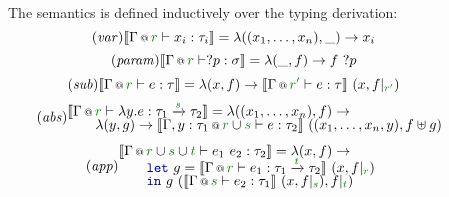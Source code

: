 \begin{figure}

{\small The semantics is defined inductively over the typing derivation:}
\begin{equation}
\tag{\emph{var}}
\sem{\coctx{\Gamma}{\cclrd{r}} \vdash x_i : \tau_i} = \lambda ((x_1, \ldots, x_n), \_) \rightarrow x_i
\end{equation}
\vspace{-1.5em}
\begin{equation}
\tag{\emph{param}}
\sem{\coctx{\Gamma}{\cclrd{r}} \vdash ?p : \sigma} = \lambda (\_, f) \rightarrow f~?p
\end{equation}
\vspace{-1.5em}
\begin{equation}
\tag{\emph{sub}}
\sem{\coctx{\Gamma}{\cclrd{r}} \vdash e : \tau} = \lambda (x, f) \rightarrow 
  \sem{\coctx{\Gamma}{\cclrd{r'}} \vdash e : \tau}~(x, \restr{f}{\cclrd{r'}})
\end{equation}
\vspace{-1.5em}
\begin{equation}
\tag{\emph{abs}}
\hspace{-0.5em}
\begin{array}{l}
  \sem{\coctx{\Gamma}{\cclrd{r}} \vdash \lambda y. e : \tau_1 \xrightarrow{\cclrd{s}} \tau_2 } = \lambda ((x_1, \ldots, x_n), f) \rightarrow\\[-0.25em]
  \qquad\lambda (y, g) \rightarrow \sem{ \coctx{\Gamma,y:\tau_1}{\cclrd{r}\cup\cclrd{s}} \vdash e : \tau_2 }~((x_1, \ldots, x_n, y), f \uplus g)   	 
\end{array}
\end{equation}
\vspace{-1.0em}
\begin{equation*}
\tag{\emph{app}}
\hspace{-0.5em}
\begin{array}{l}
  \sem{\coctx{\Gamma}{\cclrd{r}\cup\cclrd{s}\cup\cclrd{t}} \vdash e_1~e_2 : \tau_2 } = \lambda (x, f) \rightarrow \\[-0.25em]
  \qquad\kvd{let}~g=\sem{ \coctx{\Gamma}{\cclrd{r}} \vdash e_1 : \tau_1 \xrightarrow{\cclrd{t}} \tau_2 }~(x, \restr{f}{\cclrd{r}})\\[-0.25em]
  \qquad\kvd{in}~g~(\sem{ \coctx{\Gamma}{\cclrd{s}} \vdash e_2 : \tau_1 }~(x, \restr{f}{\cclrd{s}} ), \restr{f}{\cclrd{t}})
\end{array}
\end{equation*}
\vspace{-1.0em}
\begin{equation}

\end{equation}
\end{figure}
